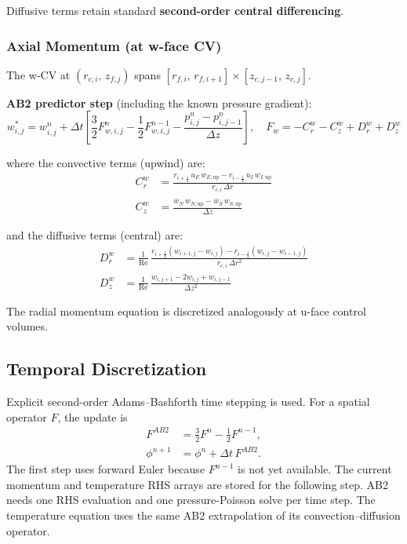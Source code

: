 \documentclass[12pt,a4paper]{article}
\newcommand{\Rey}{\text{Re}}
\begin{document}
Diffusive terms retain standard \textbf{second-order central differencing}.

\subsubsection{Axial Momentum (at w-face CV)}

The w-CV at $(r_{c,i},\, z_{f,j})$ spans $[r_{f,i},\, r_{f,i+1}] \times [z_{c,j-1},\, z_{c,j}]$.

\textbf{AB2 predictor step} (including the known pressure gradient):
\begin{equation}
\boxed{
    w^*_{i,j} = w^n_{i,j} + \Delta t\left[
    \frac{3}{2}F^n_{w,i,j}-\frac{1}{2}F^{n-1}_{w,i,j}
    -\frac{p^n_{i,j}-p^n_{i,j-1}}{\Delta z}\right],
    \quad F_w=-C_r^w-C_z^w+D_r^w+D_z^w
}
\label{eq:predictor_w}
\end{equation}

where the convective terms (upwind) are:
\begin{align}
    C_r^w &= \frac{r_{i+\frac{1}{2}}\,u_E\,w_{E,\text{up}} - r_{i-\frac{1}{2}}\,u_I\,w_{I,\text{up}}}{r_{c,i}\,\Delta r} \\
    C_z^w &= \frac{\bar{w}_N\,w_{N,\text{up}} - \bar{w}_S\,w_{S,\text{up}}}{\Delta z}
\end{align}

and the diffusive terms (central) are:
\begin{align}
    D_r^w &= \frac{1}{\Rey}\,\frac{r_{i+\frac{1}{2}}(w_{i+1,j}-w_{i,j}) - r_{i-\frac{1}{2}}(w_{i,j}-w_{i-1,j})}{r_{c,i}\,\Delta r^2} \\
    D_z^w &= \frac{1}{\Rey}\,\frac{w_{i,j+1} - 2w_{i,j} + w_{i,j-1}}{\Delta z^2}
\end{align}

The radial momentum equation is discretized analogously at u-face control volumes.

\subsection{Temporal Discretization}

Explicit second-order Adams--Bashforth time stepping is used. For a spatial
operator $F$, the update is
\begin{align}
    F^{AB2} &= \tfrac{3}{2}F^n-\tfrac{1}{2}F^{n-1}, \\
    \phi^{n+1} &= \phi^n+\Delta t\,F^{AB2}.
\end{align}
The first step uses forward Euler because $F^{n-1}$ is not yet available. The
current momentum and temperature RHS arrays are stored for the following step.
AB2 needs one RHS evaluation and one pressure-Poisson solve per time step.
The temperature equation uses the same AB2 extrapolation of its
convection--diffusion operator.
\end{document}
